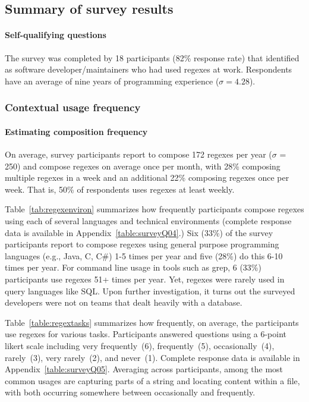\subsection{Summary of survey results}
\label{sec:surveyResults}

\paragraph{Self-qualifying questions} The survey was completed by 18 participants (82\% response rate) that identified as software developer/maintainers who had used regexes at work.  Respondents have an average of nine years of programming experience ($\sigma = 4.28$).

\subsubsection{Contextual usage frequency}
\paragraph{Estimating composition frequency}\label{sec:compositionFrequency} On average, survey participants report to compose 172 regexes per year ($\sigma$ = 250) and compose regexes on average once per month, with 28\% composing multiple regexes in a week and an additional 22\% composing regexes once per week. That is, 50\% of respondents uses regexes at least weekly.



Table~\ref{tab:regexenviron} summarizes how frequently participants compose regexes using each of several languages and technical environments (complete response data is available in Appendix~\ref{table:surveyQ04}.)  Six (33\%) of the survey participants report to compose regexes using general purpose programming languages (e.g., Java, C, C\#) 1-5 times per year and five (28\%) do this 6-10 times per year.  For command line usage in tools such as grep, 6 (33\%) participants use regexes 51+ times per year. Yet, regexes were rarely used in query languages like SQL. Upon further investigation, it turns out the surveyed developers were not on teams that dealt heavily with a database.



Table~\ref{table:regextasks} summarizes how frequently, on average, the participants use
regexes for various tasks.
Participants answered questions using a 6-point likert scale including very frequently~(6), frequently~(5), occasionally~(4), rarely~(3), very rarely~(2), and never~(1).  Complete response data is available in Appendix~\ref{table:surveyQ05}.  Averaging across participants, among the most common usages are capturing parts of a string and locating content within a file, with both occurring somewhere between occasionally and frequently.

